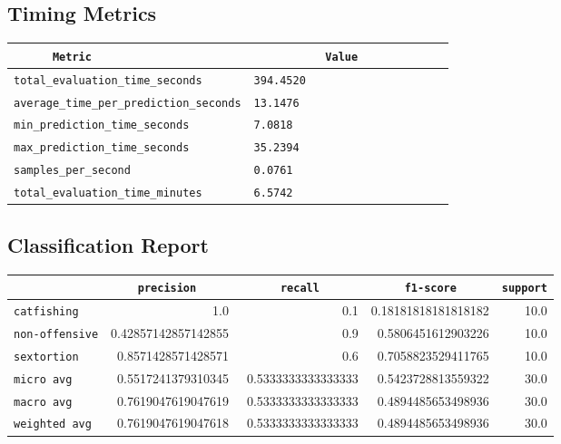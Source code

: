\documentclass{article}
\begin{document}
\subsection{Timing Metrics}

\begin{center}
\begin{tabular}{l | l} \hline
    \verb|      Metric     | & \verb|           Value           | \\ \hline
    \hline
    \verb|total_evaluation_time_seconds| & \verb|394.4520                     | \\ \hline
    \verb|average_time_per_prediction_seconds| & \verb|13.1476                      | \\ \hline
    \verb|min_prediction_time_seconds| & \verb|7.0818                       | \\ \hline
    \verb|max_prediction_time_seconds| & \verb|35.2394                      | \\ \hline
    \verb|samples_per_second| & \verb|0.0761                       | \\ \hline
    \verb|total_evaluation_time_minutes| & \verb|6.5742                       | \\ \hline
\end{tabular}
\end{center}

\subsection{Classification Report}

\begin{center}
\begin{tabular}{l | r | r | r | r} \hline
    \verb|            | & \verb|    precision     | & \verb|      recall      | & \verb|     f1-score     | & \verb|support| \\ \hline
    \hline
    \verb|catfishing | & 1.0 & 0.1 & 0.18181818181818182 &    10.0 \\ \hline
    \verb|non-offensive| & 0.42857142857142855 & 0.9 & 0.5806451612903226 &    10.0 \\ \hline
    \verb|sextortion | & 0.8571428571428571 & 0.6 & 0.7058823529411765 &    10.0 \\ \hline
    \verb|micro avg  | & 0.5517241379310345 & 0.5333333333333333 & 0.5423728813559322 &    30.0 \\ \hline
    \verb|macro avg  | & 0.7619047619047619 & 0.5333333333333333 & 0.4894485653498936 &    30.0 \\ \hline
    \verb|weighted avg| & 0.7619047619047618 & 0.5333333333333333 & 0.4894485653498936 &    30.0 \\ \hline
\end{tabular}
\end{center}
\end{document}
